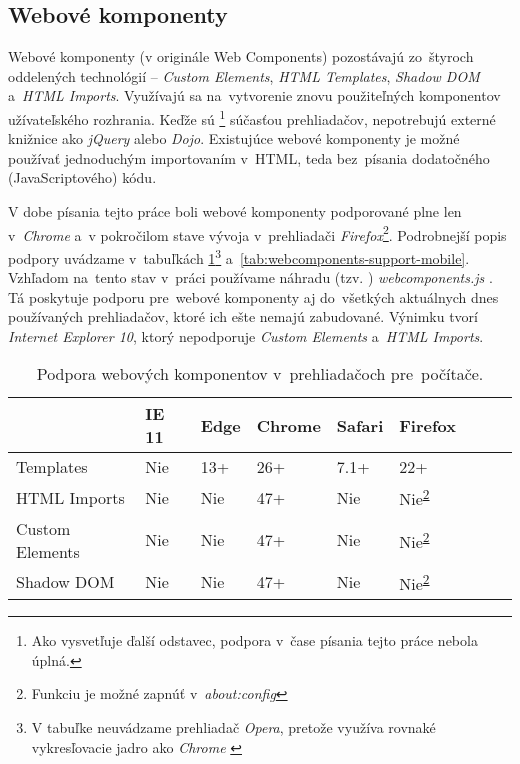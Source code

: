 \subsection{Webové komponenty}

Webové komponenty (v originále Web Components) pozostávajú zo~štyroch oddelených technológií -- \emph{Custom Elements}, \emph{HTML Templates}, \emph{Shadow DOM} a~\emph{HTML Imports}. Využívajú sa na~vytvorenie znovu použiteľných komponentov užívateľského rozhrania. Keďže sú \footnote{Ako vysvetľuje ďalší odstavec, podpora v~čase písania tejto práce nebola úplná.} súčasťou prehliadačov, nepotrebujú externé knižnice ako \emph{jQuery} alebo \emph{Dojo}. Existujúce webové komponenty je možné používať jednoduchým importovaním v~HTML, teda bez~písania dodatočného (JavaScriptového) kódu. \cite{MDN_WebComponents}

V dobe písania tejto práce boli webové komponenty podporované plne len v~\emph{Chrome} a~v pokročilom stave vývoja v~prehliadači \emph{Firefox}\footnote{Funkciu je možné zapnúť v~\emph{about:config}\label{aboutconfig}}. Podrobnejší popis podpory uvádzame v~tabuľkách \ref{tab:webcomponents-support-desktop}\footnote{V tabuľke neuvádzame prehliadač \emph{Opera}, pretože využíva rovnaké vykresľovacie jadro ako \emph{Chrome} \cite{Opera_History}} a~\ref{tab:webcomponents-support-mobile}. Vzhľadom na~tento stav v~práci používame náhradu (tzv. ) \emph{webcomponents.js} \cite{Webcomponents_polyfill}. Tá poskytuje podporu pre~webové komponenty aj do~všetkých aktuálnych dnes používaných prehliadačov, ktoré ich ešte nemajú zabudované. Výnimku tvorí \emph{Internet Explorer 10}, ktorý nepodporuje \emph{Custom Elements} a~\emph{HTML Imports}. \cite{Webcomponents_polyfill}


\begin{table}[]
\centering
\begin{tabular}{@{}|l|l|l|l|l|l|l|l|l|@{}}
\toprule
                & IE 11  & Edge & Chrome & Safari & Firefox 								   \\ \midrule
Templates       & Nie    & 13+  & 26+    & 7.1+   & 22+     								   \\ \midrule
HTML Imports    & Nie    & Nie  & 47+    & Nie    & Nie\textsuperscript{\ref{aboutconfig}}    \\ \midrule
Custom Elements & Nie    & Nie  & 47+    & Nie    & Nie\textsuperscript{\ref{aboutconfig}}    \\ \midrule
Shadow DOM      & Nie    & Nie  & 47+    & Nie    & Nie\textsuperscript{\ref{aboutconfig}}    \\ \bottomrule
\end{tabular}
\caption{Podpora webových komponentov v~prehliadačoch pre~počítače. \cite{MDN_Template_Element}\cite{CIU}}
\label{tab:webcomponents-support-desktop}
\end{table}

